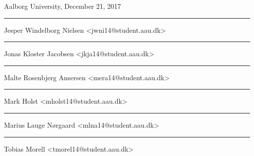\cleardoublepage
{
}
\clearpage

\vspace{\baselineskip}\hfill Aalborg University, December 21, 2017
\vfill\noindent
\begin{minipage}[b]{0.45\textwidth}
 \centering
 \rule{\textwidth}{0.5pt}\smallbreak
  Jesper Windelborg Nielsen\smallbreak
 {\footnotesize <jwni14@student.aau.dk>}
\end{minipage}
\hfill
\begin{minipage}[b]{0.45\textwidth}
 \centering
 \rule{\textwidth}{0.5pt}\smallbreak
  Jonas Kloster Jacobsen\smallbreak
 {\footnotesize <jkja14@student.aau.dk>}
\end{minipage}
\hfill
\vspace{3\baselineskip}

\begin{minipage}[b]{0.45\textwidth}
 \centering
 \rule{\textwidth}{0.5pt}\smallbreak
  Malte Rosenbjerg Ansersen\smallbreak
 {\footnotesize <mera14@student.aau.dk>}
\end{minipage}
\hfill
\begin{minipage}[b]{0.45\textwidth}
 \centering
 \rule{\textwidth}{0.5pt}\smallbreak
  Mark Holst\smallbreak
 {\footnotesize <mholst14@student.aau.dk>}
\end{minipage}
\hfill
\vspace{3\baselineskip}

\begin{minipage}[b]{0.45\textwidth}
 \centering
 \rule{\textwidth}{0.5pt}\smallbreak
  Marius Lauge Nørgaard\smallbreak
 {\footnotesize <mlna14@student.aau.dk>}
\end{minipage}
\hfill
\begin{minipage}[b]{0.45\textwidth}
 \centering
 \rule{\textwidth}{0.5pt}\smallbreak
  Tobias Morell\smallbreak
 {\footnotesize <tmorel14@student.aau.dk>}
\end{minipage}
\hfill
